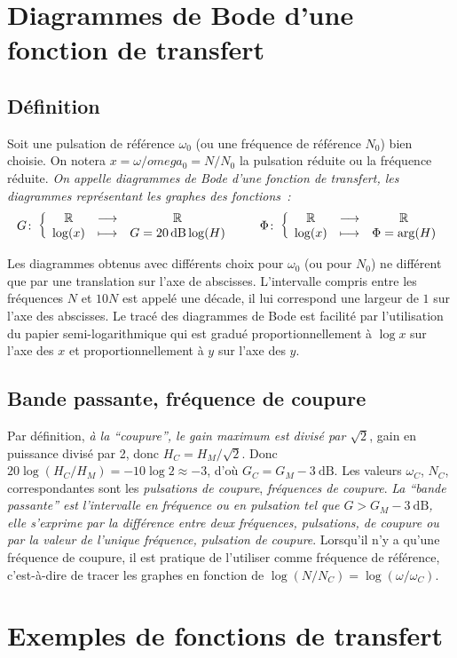 \section{Diagrammes de Bode d'une fonction de transfert}%
\subsection{Définition}%
Soit une pulsation de référence \(\omega_0\) (ou une fréquence de référence 
\(N_0\)) bien choisie. On notera \(x = \omega/omega_0 = N/N_0\) la pulsation 
réduite ou la fréquence réduite. \emph{On appelle diagrammes de Bode d'une 
fonction de transfert, les diagrammes représentant les graphes des fonctions~:}
\begin{equation}%
\fonction{G}{\R}{\R}{\log(x)}{G = \SI{20}{\dB} \log(H)} \qquad 
	\fonction{\Phi}{\R}{\R}{\log(x)}{\Phi = \arg(H)}%
\end{equation}%

Les diagrammes obtenus avec différents choix pour \(\omega_0\) (ou pour 
\(N_0\)) ne différent que par une translation sur l'axe de abscisses. 
L'intervalle compris entre les fréquences \(N\) et \(10N\) est appelé une 
décade, il lui correspond une largeur de \(1\) sur l'axe des abscisses. Le 
tracé des diagrammes de Bode est facilité par l'utilisation du papier 
semi-logarithmique qui est gradué proportionnellement à \(\log x\) sur l'axe 
des \(x\) et proportionnellement à \(y\) sur l'axe des \(y\).

\subsection{Bande passante, fréquence de coupure}%
Par définition, \emph{à la ``coupure'', le gain maximum est divisé par 
\(\sqrt{2}\)}, gain en puissance divisé par 2, donc \(H_C = H_M/\sqrt{2}\). 
Donc \(20\log(H_C/H_M) = -10\log 2 \approx -3\), d'où \(G_C = G_M 
-\SI{3}{\dB}\). Les valeurs \(\omega_C\), \(N_C\), correspondantes sont les 
\emph{pulsations de coupure}, \emph{fréquences de coupure}. \emph{La ``bande 
passante'' est l'intervalle en fréquence ou en pulsation tel que \(G > G_M - 
\SI{3}{\dB}\), elle s'exprime par la différence entre deux fréquences, 
pulsations, de coupure ou par la valeur de l'unique fréquence, pulsation de 
coupure}. Lorsqu'il n'y a qu'une fréquence de coupure, il est pratique de 
l'utiliser comme fréquence de référence, c'est-à-dire de tracer les graphes en 
fonction de \(\log(N/N_C) = \log(\omega/\omega_C)\).

\section{Exemples de fonctions de transfert}%
